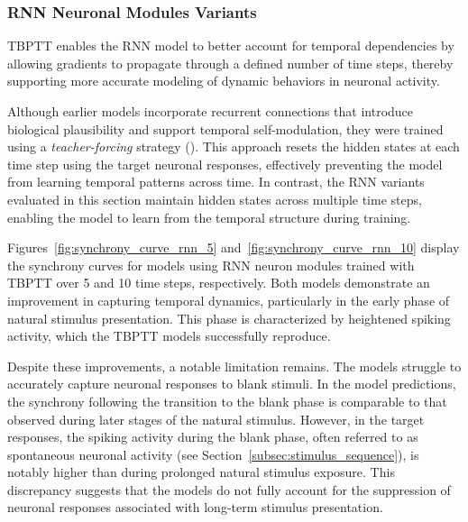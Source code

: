 \subsubsection{RNN Neuronal Modules Variants}
\label{{subsubsec:rnn_eval}}

 TBPTT enables the RNN model to better account for temporal dependencies by allowing gradients to propagate through a defined number of time steps, thereby supporting more accurate modeling of dynamic behaviors in neuronal activity.

Although earlier models incorporate recurrent connections that introduce biological plausibility and support temporal self-modulation, they were trained using a \emph{teacher-forcing} strategy (\citet{NIPS2016_16026d60}). This approach resets the hidden states at each time step using the target neuronal responses, effectively preventing the model from learning temporal patterns across time. In contrast, the RNN variants evaluated in this section maintain hidden states across multiple time steps, enabling the model to learn from the temporal structure during training.

Figures~\ref{fig:synchrony_curve_rnn_5} and~\ref{fig:synchrony_curve_rnn_10} display the synchrony curves for models using RNN neuron modules trained with TBPTT over 5 and 10 time steps, respectively. Both models demonstrate an improvement in capturing temporal dynamics, particularly in the early phase of natural stimulus presentation. This phase is characterized by heightened spiking activity, which the TBPTT models successfully reproduce.

Despite these improvements, a notable limitation remains. The models struggle to accurately capture neuronal responses to blank stimuli. In the model predictions, the synchrony following the transition to the blank phase is comparable to that observed during later stages of the natural stimulus. However, in the target responses, the spiking activity during the blank phase, often referred to as spontaneous neuronal activity (see Section~\ref{subsec:stimulus_sequence}), is notably higher than during prolonged natural stimulus exposure. This discrepancy suggests that the models do not fully account for the suppression of neuronal responses associated with long-term stimulus presentation.


